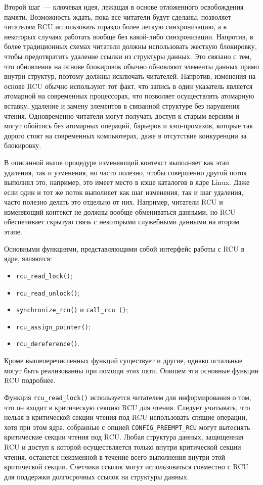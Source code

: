 Второй шаг~--- ключевая идея, лежащая в основе отложенного освобождения памяти.
Возможность ждать, пока все читатели будут сделаны, позволяет читателям RCU
использовать гораздо более легкую синхронизацию, а в некоторых случаях работать
вообще без какой-либо синхронизации. Напротив, в более традиционных схемах
читатели должны использовать жесткую блокировку, чтобы предотвратить удаление
ссылки из структуры данных. Это связано с тем, что обновления на основе
блокировок обычно обновляют элементы данных прямо внутри структур, поэтому
должны исключать читателей. Напротив, изменения на основе RCU обычно используют
тот факт, что запись в один указатель является атомарной на современных
процессорах, что позволяет осуществлять атомарную вставку, удаление и замену
элементов в связанной структуре без нарушения чтения. Одновременно читатели
могут получать доступ к старым версиям и могут обойтись без атомарных операций,
барьеров и кэш-промахов, которые так дорого стоят на современных компьютерах,
даже в отсутствие конкуренции за блокировку.

В описанной выше процедуре изменяющий контекст выполняет как этап
удаления, так и узменения, но часто полезно, чтобы совершенно другой поток
выполнял это, например, это имеет место в кэше каталогов в ядре Linux. Даже если
один и тот же поток выполняет как шаг изменения, так и шаг удаления, часто
полезно делать это отдельно от них. Например, читатели RCU и изменяющий контекст
не должны вообще обмениваться данными, но RCU обеспечивает скрытую связь с
некоторыми служебными данными на втором этапе.

Основными функциями, представляющими собой интерфейс работы с RCU в ядре,
являются:
\begin{itemize}
\item \texttt{rcu\_read\_lock()};
\item \texttt{rcu\_read\_unlock()};
\item \texttt{synchronize\_rcu()} и \texttt{call\_rcu ()};
\item \texttt{rcu\_assign\_pointer()};
\item \texttt{rcu\_dereference()}.
\end{itemize}

Кроме вышеперечисленных функций существует и другие, однако остальные могут быть
реализованны при помощи этих пяти. Опишем эти основные функции RCU подробнее.

Функция \texttt{rcu\_read\_lock()} используется читателем для информирования о
том, что он входит в критическую секцию RCU для чтения. Следует учитывать, что
нельзя в критической секции чтения под RCU использовать спящие операции, хотя
при этом ядра, собранные с опцией \texttt{CONFIG\_PREEMPT\_RCU} могут вытеснять
критические секции чтения под RCU. Любая структура данных, защищенная RCU и
доступ к которой осуществляется только внутри критической секции чтения,
останется неизменной в течение всего выполнения внутри этой критической секции.
Счетчики ссылок могут использоваться совместно с RCU для поддержки долгосрочных
ссылок на структуры данных.

